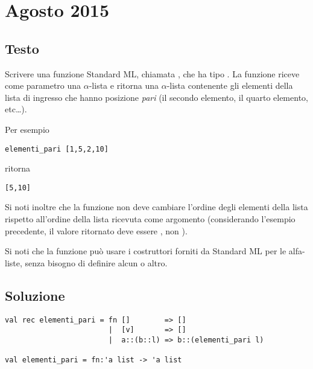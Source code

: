\section{Agosto 2015}

\subsection{Testo}

Scrivere una funzione Standard ML, chiamata , che ha tipo . La funzione riceve come parametro una \(\alpha\)-lista e ritorna una \(\alpha\)-lista contenente gli elementi della lista di ingresso che hanno posizione \emph{pari} (il secondo elemento, il quarto elemento, etc\dots).

\medskip
Per esempio

\begin{lstlisting}
elementi_pari [1,5,2,10]
\end{lstlisting}

ritorna

\begin{lstlisting}
[5,10]
\end{lstlisting}

\medskip
Si noti inoltre che la funzione  non deve cambiare l'ordine degli elementi della lista rispetto all'ordine della lista ricevuta come argomento (considerando l'esempio precedente, il valore ritornato deve essere \sml{[5,10]}, non \sml{[10,5]}).

\medskip
Si noti che la funzione  può usare i costruttori forniti da Standard ML per le alfa-liste, senza bisogno di definire alcun  o altro.

\subsection{Soluzione}

\begin{lstlisting}[style = SML, caption={Definizione della funzione \sml{elementi\_pari}}]
val rec elementi_pari = fn []        => []
						|  [v]       => []
						|  a::(b::l) => b::(elementi_pari l)

val elementi_pari = fn:'a list -> 'a list
\end{lstlisting}

